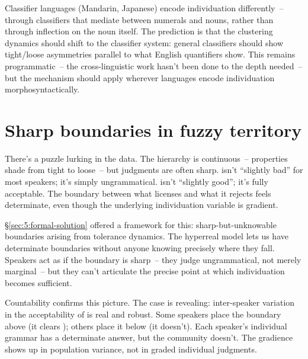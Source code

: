 Classifier languages (Mandarin, Japanese) encode individuation differently~-- through classifiers that mediate between numerals and nouns, rather than through inflection on the noun itself. The prediction is that the clustering dynamics should shift to the classifier system: general classifiers should show tight/loose asymmetries parallel to what English quantifiers show. This remains programmatic~-- the cross-linguistic work hasn't been done to the depth needed~-- but the mechanism should apply wherever languages encode individuation morphosyntactically.

\section{Sharp boundaries in fuzzy territory}
\label{sec:9:hyperreal}

There's a puzzle lurking in the data. The hierarchy is continuous~-- properties shade from tight to loose~-- but judgments are often sharp.  isn't \enquote{slightly bad} for most speakers; it's simply ungrammatical.  isn't \enquote{slightly good}; it's fully acceptable. The boundary between what  licenses and what it rejects feels determinate, even though the underlying individuation variable is gradient.

§\ref{sec:5:formal-solution} offered a framework for this: sharp-but-unknowable boundaries arising from tolerance dynamics. The hyperreal model lets us have determinate boundaries without anyone knowing precisely where they fall. Speakers act as if the boundary is sharp~-- they judge  ungrammatical, not merely marginal~-- but they can't articulate the precise point at which individuation becomes sufficient.

Countability confirms this picture. The  case is revealing: inter-speaker variation in the acceptability of  is real and robust. Some speakers place the boundary above  (it clears ); others place it below (it doesn't). Each speaker's individual grammar has a determinate answer, but the community doesn't. The gradience shows up in population variance, not in graded individual judgments.

